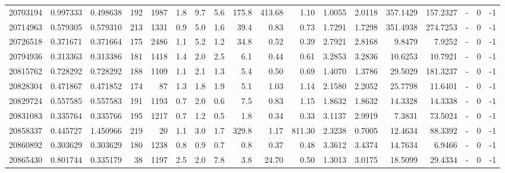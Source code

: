 \begin{tabular}{rrrrrrrrrrrrrrrlrr}
  20703194 & 0.997333 &   0.498638 &  192 & 1987 &      1.8 &      9.7 &     5.6 &    175.8 &     413.68 &        1.10 &  1.0055 &  2.0118 &  357.1429 &  157.2327 &             - &        0 &         -1 \\
  20714963 & 0.579305 &   0.579310 &  213 & 1331 &      0.9 &      5.0 &     1.6 &     39.4 &       0.83 &        0.73 &  1.7291 &  1.7298 &  351.4938 &  274.7253 &             - &        0 &         -1 \\
  20726518 & 0.371671 &   0.371664 &  175 & 2486 &      1.1 &      5.2 &     1.2 &     34.8 &       0.52 &        0.39 &  2.7921 &  2.8168 &    9.8479 &    7.9252 &             - &        0 &         -1 \\
  20794936 & 0.313363 &   0.313386 &  181 & 1418 &      1.4 &      2.0 &     2.5 &      6.1 &       0.44 &        0.61 &  3.2853 &  3.2836 &   10.6253 &   10.7921 &             - &        0 &         -1 \\
  20815762 & 0.728292 &   0.728292 &  188 & 1109 &      1.1 &      2.1 &     1.3 &      5.4 &       0.50 &        0.69 &  1.4070 &  1.3786 &   29.5029 &  181.3237 &             - &        0 &         -1 \\
  20828304 & 0.471867 &   0.471852 &  174 &   87 &      1.3 &      1.8 &     1.9 &      5.1 &       1.03 &        1.14 &  2.1580 &  2.2052 &   25.7798 &   11.6401 &             - &        0 &         -1 \\
  20829724 & 0.557585 &   0.557583 &  191 & 1193 &      0.7 &      2.0 &     0.6 &      7.5 &       0.83 &        1.15 &  1.8632 &  1.8632 &   14.3328 &   14.3338 &             - &        0 &         -1 \\
  20831083 & 0.335764 &   0.335766 &  195 & 1217 &      0.7 &      1.2 &     0.5 &      1.8 &       0.34 &        0.33 &  3.1137 &  2.9919 &    7.3831 &   73.5024 &             - &        0 &         -1 \\
  20858337 & 0.445727 &   1.450966 &  219 &   20 &      1.1 &      3.0 &     1.7 &    329.8 &       1.17 &      811.30 &  2.3238 &  0.7005 &   12.4634 &   88.3392 &             - &        0 &         -1 \\
  20860892 & 0.303629 &   0.303629 &  180 & 1238 &      0.8 &      0.9 &     0.7 &      0.8 &       0.37 &        0.48 &  3.3612 &  3.4374 &   14.7634 &    6.9466 &             - &        0 &         -1 \\
  20865430 & 0.801744 &   0.335179 &   38 & 1197 &      2.5 &      2.0 &     7.8 &      3.8 &      24.70 &        0.50 &  1.3013 &  3.0175 &   18.5099 &   29.4334 &             - &        0 &         -1 \\

\end{tabular}
